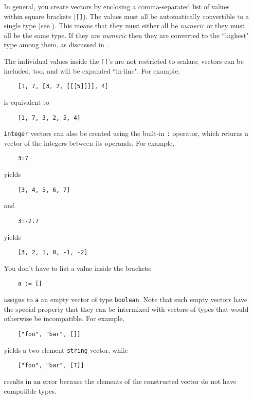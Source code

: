 In general,
you create vectors by enclosing a comma-separated list of
values within
square brackets ({\tt []}).  The values must all be automatically
convertible to a single type (see ).  This
means that they must either all be {\em numeric} or they must all be the
same type.  If they are {\em numeric} then they are converted to the ``highest"
type among them, as discussed in .

The individual values inside the {\tt []}'s are not restricted to
scalars; vectors can be included, too, and will be expanded ``in-line".
For example,
\begin{verbatim}
    [1, 7, [3, 2, [[[5]]]], 4]
\end{verbatim}
is equivalent to
\begin{verbatim}
    [1, 7, 3, 2, 5, 4]
\end{verbatim}

{\tt integer} vectors
can also be created using the built-in {\tt :}
operator, which returns a vector of the integers between its operands.
For example,
\begin{verbatim}
    3:7
\end{verbatim}
yields
\begin{verbatim}
    [3, 4, 5, 6, 7]
\end{verbatim}
and
\begin{verbatim}
    3:-2.7
\end{verbatim}
yields
\begin{verbatim}
    [3, 2, 1, 0, -1, -2]
\end{verbatim}

You don't have to list a value inside the brackets:
\label{empty-vector}
\begin{verbatim}
    a := []
\end{verbatim}
assigns to {\tt a} an empty vector of type {\tt boolean}.  Note that
such empty vectors have the special property that they can be intermixed
with vectors of types that would otherwise be incompatible.  For example,
\begin{verbatim}
    ["foo", "bar", []]
\end{verbatim}
yields a two-element {\tt string} vector, while
\begin{verbatim}
    ["foo", "bar", [T]]
\end{verbatim}
results in an error because the elements of the constructed
vector do not have compatible types.


